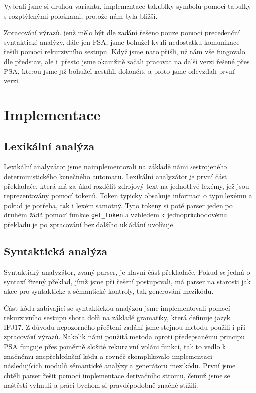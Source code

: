\documentclass[11pt, titlepage, a4paper]{article}
\begin{document}
		Vybrali jsme si druhou variantu, implementace takublky symbolů pomocí tabulky s rozptýlenými položkami, protože nám byla
		bližší.

		Zpracování výrazů, jenž mělo být dle zadání řešeno pouze pomocí precedenční syntaktické analýzy, dále jen PSA, jsme bohužel
		kvůli nedostatku komunikace řešili pomocí rekurzivního sestupu. Když jsme nato přišli, už nám vše fungovalo dle představ, ale i~přesto jsme
		okamžitě začali pracovat na další verzi řešené přes PSA, kterou jsme již bohužel nestihli dokončit, a proto jsme odevzdali první verzi.


		\section{Implementace}

		\subsection{Lexikální analýza}
		\indent \indent Lexikální analyzátor jsme naimplementovali na základě námi sestrojeného deterministického konečného automatu.
		Lexikální analyzátor je první část překladače, která má za úkol rozdělit zdrojový text na jednotlivé lexémy, jež jsou reprezentovány pomocí tokenů.
		Token typicky obsahuje informaci o typu lexému a pokud je potřeba, tak i lexém samotný.
		Tyto tokeny si poté parser jeden po druhém žádá pomocí funkce \texttt{get\_token} a vzhledem k jednoprůchodovému překladu je po zpracování
		bez dalšího ukládání uvolňuje.
		
		\subsection{Syntaktická analýza}
		\indent \indent Syntaktický analyzátor, zvaný parser, je hlavní část překladače. Pokud se jedná o syntaxí řízený překlad, jímž jsme při řešení
		 postupovali, má parser na starosti jak akce pro syntaktické a sémantické kontroly, tak generování mezikódu.

		Část kódu zabívající se syntaktickou analýzou jsme implementovali pomocí rekurzivního sestupu shora dolů na základě gramatiky, která definuje
		jazyk IFJ17.
		Z důvodu nepozorného přečtení zadání jsme stejnou metodu použili i při zpracování výrazů.
		Nakolik námi použitá metoda oproti předepsanému principu PSA funguje přes poměrně složité rekurzivní voláni funkcí, tak to vedlo k
		značnému znepřehlednění kódu a rovněž zkomplikovalo implementaci následujících modulů sémantické analýzy a generátoru mezikódu.
		První jsme chtěli parser řešit pomocí implementace derivačního stromu, čemuž jsme se naštěstí vyhnuli a práci bychom si pravděpodobně
		značně stížili.
\end{document}
